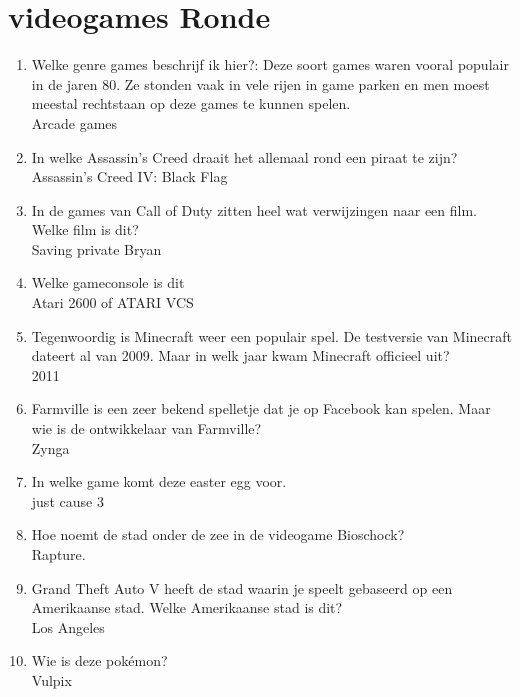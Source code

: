 \section{videogames Ronde}
\begin{enumerate}

\item{Welke genre games beschrijf ik hier?: Deze soort games waren vooral populair in de jaren 80. Ze stonden vaak in vele rijen in game parken en men moest meestal rechtstaan op deze games te kunnen spelen.\\Arcade games}
\item{In welke Assassin’s Creed draait het allemaal rond een piraat te zijn? \\
Assassin’s Creed IV: Black Flag}
\item{In de games van Call of Duty zitten heel wat verwijzingen naar een film. Welke film is dit?\\ Saving private Bryan}
\item{Welke gameconsole is dit\\ Atari 2600 of ATARI VCS}
\item{Tegenwoordig is Minecraft weer een populair spel. De testversie van Minecraft dateert al van 2009. Maar in welk jaar kwam Minecraft officieel uit?\\ 2011}
\item{Farmville is een zeer bekend spelletje dat je op Facebook kan spelen. Maar wie is de ontwikkelaar van Farmville? \\ Zynga}
\item{In welke game komt deze easter egg voor.\\ just cause 3}
\item{Hoe noemt de stad onder de zee in de videogame Bioschock?\\ Rapture.}
\item{Grand Theft Auto V heeft de stad waarin je speelt gebaseerd op een Amerikaanse stad. Welke Amerikaanse stad is dit?\\ Los Angeles}
\item{Wie is deze pokémon?\\ Vulpix}

\end{enumerate}
